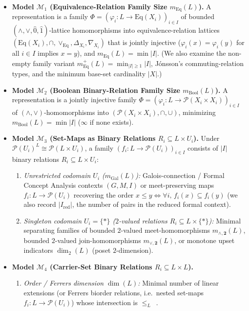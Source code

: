 \documentclass[11pt]{article}
\theoremstyle{definition}
\theoremstyle{remark}
\newcommand{\Eq}{\mathrm{Eq}}
\newcommand{\Pow}{\mathcal{P}}
\newcommand{\BoolTwo}{\mathbf{2}}
\begin{document}
\begin{itemize}
\item \textbf{Model $\mathcal{M}_1$ (Equivalence-Relation Family Size $m_{\Eq}(L)$).} A representation is a family $\Phi = (\varphi_i \colon L \to \Eq(X_i))_{i \in I}$ of bounded $(\wedge,\vee,\hat{0},\hat{1})$-lattice homomorphisms into equivalence-relation lattices $(\Eq(X_i), \cap, \vee_{\Eq}, \Delta_{X_i}, \nabla_{X_i})$ that is jointly injective ($\varphi_i(x) = \varphi_i(y)$ for all $i \in I$ implies $x = y$), and $m_{\Eq}(L) = \min |I|$. (We also examine the non-empty family variant $m_{\Eq}^+(L) = \min_{|I|\ge 1}|I|$, J\'onsson's commuting-relation types, and the minimum base-set cardinality $|X|$.)
\item \textbf{Model $\mathcal{M}_2$ (Boolean Binary-Relation Family Size $m_{\mathrm{Bool}}(L)$).} A representation is a jointly injective family $\Phi = (\varphi_i \colon L \to \Pow(X_i \times X_i))_{i \in I}$ of $(\wedge,\vee)$-homomorphisms into $(\Pow(X_i \times X_i), \cap, \cup)$, minimizing $m_{\mathrm{Bool}}(L) = \min |I|$ ($\infty$ if none exists).
\item \textbf{Model $\mathcal{M}_3$ (Set-Maps as Binary Relations $R_i \subseteq L \times U_i$).} Under $\Pow(U_i)^L \cong \Pow(L \times U_i)$, a family $(f_i \colon L \to \Pow(U_i))_{i \in I}$ consists of $|I|$ binary relations $R_i \subseteq L \times U_i$:
  \begin{enumerate}
  \item[(i)] \emph{Unrestricted codomain $U_i$ ($m_{\mathrm{Gal}}(L)$):} Galois-connection / Formal Concept Analysis contexts $(G,M,I)$ or meet-preserving maps $f_i \colon L \to \Pow(U_i)$ recovering the order $x \le y \iff \forall i,\, f_i(x) \subseteq f_i(y)$ (we also record $|I_{\mathrm{red}}|$, the number of pairs in the reduced formal context).
  \item[(ii)] \emph{Singleton codomain $U_i = \{\ast\}$ ($2$-valued relations $R_i \subseteq L \times \{\ast\}$):} Minimal separating families of bounded $2$-valued meet-homomorphisms $m_{\wedge,\BoolTwo}(L)$, bounded $2$-valued join-homomorphisms $m_{\vee,\BoolTwo}(L)$, or monotone upset indicators $\dim_2(L)$ (poset $2$-dimension).
  \end{enumerate}
\item \textbf{Model $\mathcal{M}_4$ (Carrier-Set Binary Relations $R_i \subseteq L \times L$).}
  \begin{enumerate}
  \item[(i)] \emph{Order / Ferrers dimension $\dim(L)$:} Minimal number of linear extensions (or Ferrers biorder relations, i.e.\ nested set-maps $f_i \colon L \to \Pow(U_i)$) whose intersection is ${\le_L}$~\cite{DushnikMiller1941,Bouchet1971}.

\end{enumerate}
\end{itemize}
\end{document}
